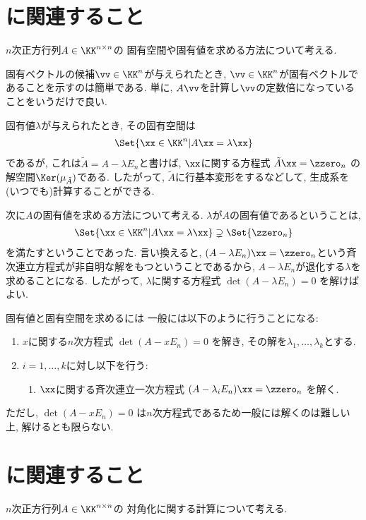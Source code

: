 \section{に関連すること}
$n$次正方行列$A\in\KK^{n\times n}$の
固有空間や固有値を求める方法について考える.

固有ベクトルの候補$\vv\in \KK^n$が与えられたとき,
$\vv\in \KK^n$が固有ベクトルであることを示すのは簡単である.
単に, $A\vv$を計算し$\vv$の定数倍になっていることをいうだけで良い.


固有値$\lambda$が与えられたとき,
その固有空間は
\begin{align*}
  \Set{\xx\in \KK^n|A\xx=\lambda\xx}
\end{align*}
であるが, これは$\tilde A=A-\lambda E_n$と書けば,
$\xx$に関する方程式
$\tilde A \xx=\zzero_n$
の解空間$\Ker(\mu_{\tilde A})$である.
したがって, $\tilde A$に行基本変形をするなどして,
生成系を(いつでも)計算することができる.

次に$A$の固有値を求める方法について考える.
$\lambda$が$A$の固有値であるということは,
\begin{align*}
  \Set{\xx\in \KK^n|A\xx=\lambda\xx}\supsetneq \Set{\zzero_n}
\end{align*}
を満たすということであった.
言い換えると,
$(A-\lambda E_n)\xx=\zzero_n$という斉次連立方程式が非自明な解をもつということであるから,
$A-\lambda E_n$が退化する$\lambda$を求めることになる.
したがって,
$\lambda$に関する方程式
$\det(A-\lambda E_n)=0$
を解けばよい.

固有値と固有空間を求めるには
一般には以下のように行うことになる:
\begin{enumerate}
\item
  $x$に関する$n$次方程式
  $\det(A-x E_n)=0$
  を解き,
  その解を$\lambda_1,\ldots,\lambda_k$とする.
\item $i=1,\ldots,k$に対し以下を行う:
  \begin{enumerate}
  \item
    $\xx$に関する斉次連立一次方程式
    $(A-\lambda_i E_n)\xx=\zzero_n$
    を解く.
  \end{enumerate}
\end{enumerate}
ただし,
$\det(A-x E_n)=0$
は$n$次方程式であるため一般には解くのは難しい上, 解けるとも限らない.



\section{に関連すること}
$n$次正方行列$A\in\KK^{n\times n}$の
対角化に関する計算について考える.

